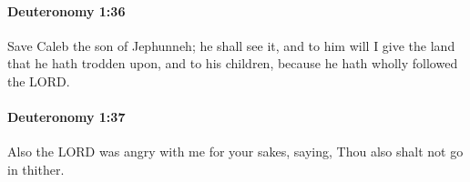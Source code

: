 		\paragraph{Deuteronomy 1:36} %
			\label{DEUTERONOMY-1-36}

			Save Caleb the son of Jephunneh; he shall see it, and to him will I give the land that he hath trodden upon, and to his children, because he hath wholly followed the LORD.


		\paragraph{Deuteronomy 1:37} %
			\label{DEUTERONOMY-1-37}

			Also the LORD was angry with me for your sakes, saying, Thou also shalt not go in thither.


